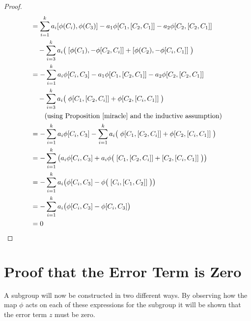 \documentclass[honours]{UNSWthesis}
\newcommand{\1}{\mathbf{e}_{1}}
\newcommand{\2}{\mathbf{e}_{3}}
\newcommand{\3}{\mathbf{e}_{3}}
\begin{document}
\begin{proof}
\begin{align*}
&= \sum\limits_{i=1}^{k} a_{i}[\phi(C_{i}),\phi(C_{3})]-a_{1}\phi[C_{1},[C_{2},C_{1}]]-a_{2}\phi[C_{2},[C_{2},C_{1}]] \\
&\quad- \sum\limits_{i=3}^{k} a_{i}\big(\; [\phi(C_{1}),-\phi[C_{2},C_{i}]]+[\phi(C_{2}),-\phi[C_{i},C_{1}]] \;\big) \\
&=-\sum\limits_{i=1}^{k} a_{i}\phi[C_{i},C_{3}]-a_{1}\phi[C_{1},[C_{2},C_{1}]]-a_{2}\phi[C_{2},[C_{2},C_{1}]] \\
&\quad- \sum\limits_{i=3}^{k} a_{i}\big(\; \phi[C_{1},[C_{2},C_{i}]]+\phi[C_{2},[C_{i},C_{1}]] \;\big) \\
& \quad \quad \text{(using Proposition \ref{miracle} and the inductive assumption) } \\
&=-\sum\limits_{i=1}^{k} a_{i}\phi[C_{i},C_{3}]- \sum\limits_{i=1}^{k} a_{i}\big(\; \phi[C_{1},[C_{2},C_{i}]]+\phi[C_{2},[C_{i},C_{1}]] \;\big) \\
&=-\sum\limits_{i=1}^{k} \big( a_{i}\phi[C_{i},C_{3}]+ a_{i}\phi\big(\; [C_{1},[C_{2},C_{i}]]+[C_{2},[C_{i},C_{1}]] \;\big)\big) \\
&=-\sum\limits_{i=1}^{k} a_{i}\big(\phi[C_{i},C_{3}]- \phi\big(\; [C_{i},[C_{1},C_{2}]] \;\big)\big) \\
&=-\sum\limits_{i=1}^{k} a_{i}\big(\phi[C_{i},C_{3}]- \phi[C_{i},C_{3}] \big) \\
&=0
\end{align*}
\end{proof}

\section{Proof that the Error Term is Zero}

A subgroup will now be constructed in two different ways. By observing how the map $\phi$ acts on each of these expressions for the subgroup it will be shown that the error term $z$ must be zero.
\end{document}
